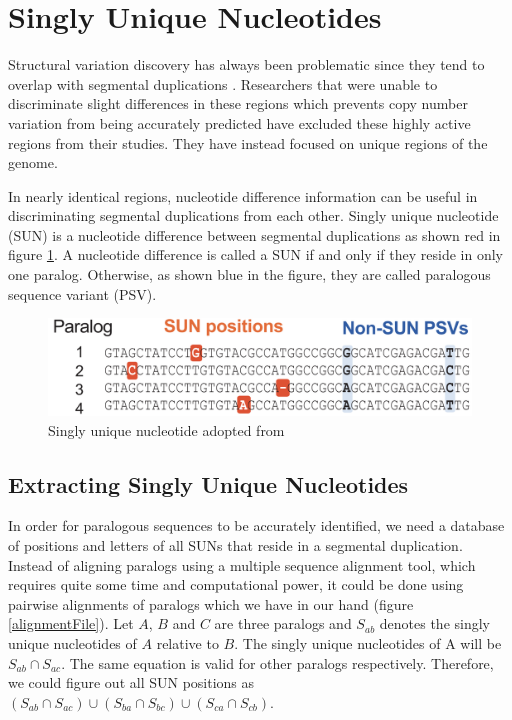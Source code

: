 \section{Singly Unique Nucleotides}
Structural variation discovery has always been problematic since they tend to overlap with segmental duplications \cite{sudmant2010diversity}. Researchers that were unable to discriminate slight differences in these regions which prevents copy number variation from being accurately predicted have excluded these highly active regions from their studies. They have instead focused on unique regions of the genome.

In nearly identical regions, nucleotide difference information can be useful in discriminating segmental duplications from each other. Singly unique nucleotide (SUN) is a nucleotide difference between segmental duplications as shown red in figure \ref{singlyUniqueNucleotide}. A nucleotide difference is called a SUN if and only if they reside in only one paralog. Otherwise, as shown blue in the figure, they are called  paralogous sequence variant (PSV). 
\begin{figure}[ht]
    \centering
    \includegraphics[scale=0.4]{images/singlyUniqueNucleotide.png}
    \caption{Singly unique nucleotide adopted from \cite{sudmant2010diversity}}
    \label{singlyUniqueNucleotide}
\end{figure}

\subsection{Extracting Singly Unique Nucleotides}
In order for paralogous sequences to be accurately identified, we need a database of positions and letters of all SUNs that reside in a segmental duplication. Instead of aligning paralogs using a multiple sequence alignment tool, which requires quite some time and computational power, it could be done using pairwise alignments of paralogs which we have in our hand (figure \ref{alignmentFile}). Let $A$, $B$ and $C$ are three paralogs and  $S_{ab}$ denotes the singly unique nucleotides of $A$ relative to $B$. The singly unique nucleotides of A will be $S_{ab} \cap S_{ac}$. The same equation is valid for other paralogs respectively. Therefore, we could figure out all SUN positions as $(S_{ab} \cap S_{ac}) \cup (S_{ba} \cap S_{bc}) \cup (S_{ca} \cap S_{cb})$.

